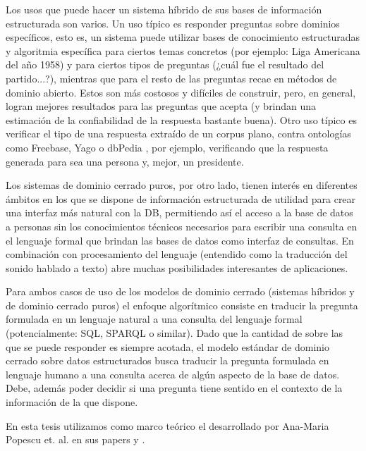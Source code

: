 Los usos que puede hacer un sistema híbrido de sus bases de información estructurada son varios. Un uso típico es responder preguntas sobre dominios específicos, esto es, un sistema puede utilizar bases de conocimiento estructuradas y algoritmia específica para ciertos temas concretos (por ejemplo: Liga Americana del año 1958) y para ciertos tipos de preguntas (¿cuál fue el resultado del partido...?), mientras que para el resto de las preguntas recae en métodos de dominio abierto. Estos  son más costosos y difíciles de construir, pero, en general, logran mejores resultados para las preguntas que acepta (y brindan una estimación de la confiabilidad de la respuesta bastante buena). Otro uso típico es verificar el tipo de una respuesta extraído de un corpus plano, contra ontologías como Freebase, Yago o dbPedia \cite{WATSON2}, por ejemplo, verificando que la respuesta generada para  sea una persona y, mejor, un presidente.

Los sistemas de dominio cerrado puros, por otro lado, tienen interés en diferentes ámbitos en los que se dispone de información estructurada de utilidad para crear una interfaz más natural con la DB, permitiendo así el acceso a la base de datos a personas sin los conocimientos técnicos necesarios para escribir una consulta en el lenguaje formal que brindan las bases de datos como interfaz de consultas. En combinación con procesamiento del lenguaje (entendido como la traducción del sonido hablado a texto) abre muchas posibilidades interesantes de aplicaciones.

Para ambos casos de uso de los modelos de dominio cerrado (sistemas híbridos y de dominio cerrado puros) el enfoque algorítmico consiste en traducir la pregunta formulada en un lenguaje natural a una consulta del lenguaje formal (potencialmente: SQL, SPARQL o similar). Dado que la cantidad de  sobre las que se puede responder es siempre acotada, el modelo estándar de dominio cerrado sobre datos estructurados busca traducir la pregunta formulada en lenguaje humano a una consulta acerca de algún aspecto de la base de datos. Debe, además poder decidir si una pregunta tiene sentido en el contexto de la información de la que dispone.


En esta tesis utilizamos como marco teórico el desarrollado por Ana-Maria Popescu et. al. en sus papers \cite{QADB1} y \cite{QADB2}.

